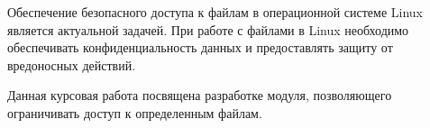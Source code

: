 \Introduction

Обеспечение безопасного доступа к файлам в операционной системе Linux является актуальной задачей.  
При работе с файлами в Linux необходимо обеспечивать конфиденциальность данных и предоставлять защиту от вредоносных действий.

Данная курсовая работа посвящена разработке модуля, позволяющего ограничивать доступ к определенным файлам.